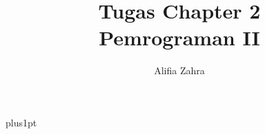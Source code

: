 \documentclass[12pt]{ociamthesis}  %
\title{Tugas Chapter 2 \\[1ex]     %
        Pemrograman II}   %
\author{Alifia Zahra}             %
\begin{document}
\baselineskip=18pt plus1pt

\setcounter{secnumdepth}{3}
\setcounter{tocdepth}{3}


\maketitle                  %

\begin{romanpages}          %
\tableofcontents            %
\listoffigures              %
\end{romanpages}            %




\end{document}
